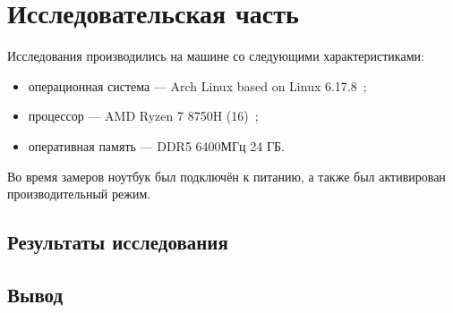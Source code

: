 \chapter{Исследовательская часть}


Исследования производились на машине со следующими характеристиками:

\begin{itemize}
	
	\item операционная система --- Arch Linux based on Linux 6.17.8~\cite{arch_wiki};
	
	\item процессор --- AMD Ryzen 7 8750H (16)~\cite{ryzen};
	
	\item оперативная память --- DDR5 6400МГц 24 ГБ.
	
\end{itemize}

Во время замеров ноутбук был подключён к питанию, а также был активирован производительный режим.

\section{Результаты исследования}

\section*{Вывод}